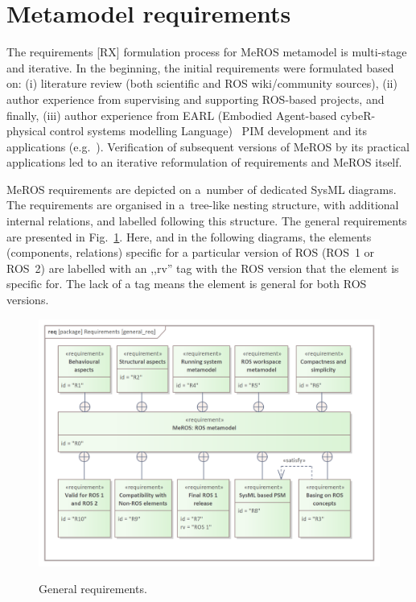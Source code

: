 \section{Metamodel requirements}
\label{sec:requirements}
The requirements [RX] formulation process for MeROS metamodel is multi-stage and iterative. In the beginning, the initial requirements were formulated based on: (i) literature review (both scientific and ROS wiki/community sources), (ii) author experience from supervising and supporting ROS-based projects, and finally, (iii) author experience from EARL (Embodied Agent-based cybeR-physical control systems modelling Language)~\cite{earl2020} PIM development and its applications (e.g.~\cite{tasker2020,karwowski2021hubero,en14206693-grav-comp}). Verification of subsequent versions of MeROS by its practical applications led to an iterative reformulation of requirements and MeROS itself.

MeROS requirements are depicted on a~number of dedicated SysML diagrams. The requirements are organised in a~tree-like nesting structure, with additional internal relations, and labelled following this structure. The general requirements are presented in Fig.~\ref{fig:general_req}. Here, and in the following diagrams, the elements (components, relations) specific for a particular version of ROS (ROS~1 or ROS~2) are labelled with an ,,rv''  tag with the ROS version that the element is specific for. The lack of a tag means the element is general for both ROS versions.


\begin{figure}[H]
	\centering
	\begin{center}
	{\includegraphics[scale=0.9]{../imgs/requirement_pkg/general_req.png}}
	\end{center}
	\caption{General requirements.}
	\label{fig:general_req}
\end{figure}


